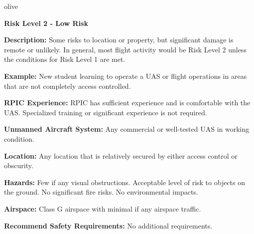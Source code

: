 \documentclass[
]{book}
\newenvironment{content}{\hrulefill}{}{}
\newenvironment{titleB}{}{}
\begin{document}
\begin{content-box}{olive}

\begin{titleB}

\textbf{Risk Level 2 - Low Risk}

\end{titleB}

\begin{content}

\textbf{Description:} Some risks to location or property, but significant damage is remote or unlikely. In general, most flight activity would be Risk Level 2 unless the conditions for Risk Level 1 are met.

\textbf{Example:} New student learning to operate a UAS or flight operations in areas that are not completely access controlled.

\textbf{RPIC Experience:} RPIC has sufficient experience and is comfortable with the UAS. Specialized training or significant experience is not required.

\textbf{Unmanned Aircraft System:} Any commercial or well-tested UAS in working condition.

\textbf{Location:} Any location that is relatively secured by either access control or obscurity.

\textbf{Hazards:} Few if any visual obstructions. Acceptable level of risk to objects on the ground. No significant fire risks. No environmental impacts.

\textbf{Airspace:} Class G airspace with minimal if any airspace traffic.

\textbf{Recommend Safety Requirements:} No additional requirements.

\end{content}

\end{content-box}
\end{document}
